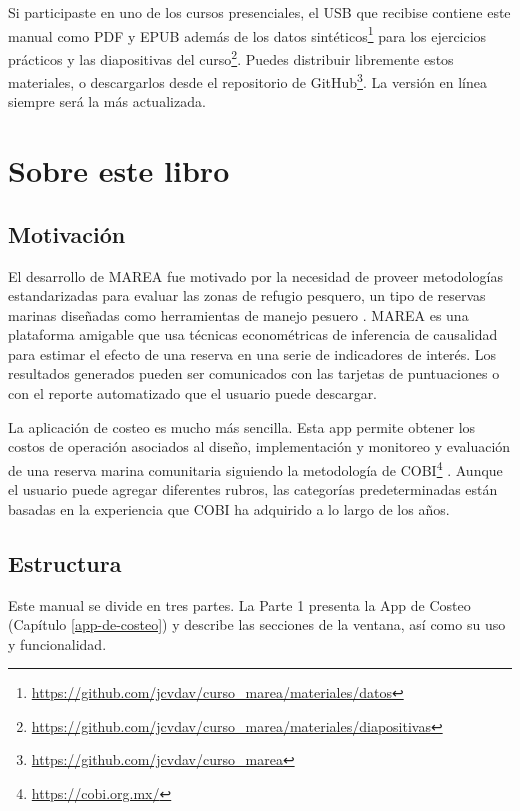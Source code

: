 \documentclass[]{krantz}
\renewcommand{\href}[2]{#2\footnote{\url{#1}}}
\begin{document}
Si participaste en uno de los cursos presenciales, el USB que recibise
contiene este manual como PDF y EPUB además de los
\href{https://github.com/jcvdav/curso_marea/materiales/datos}{datos
sintéticos} para los ejercicios prácticos y las
\href{https://github.com/jcvdav/curso_marea/materiales/diapositivas}{diapositivas
del curso}. Puedes distribuir libremente estos materiales, o
descargarlos desde el
\href{https://github.com/jcvdav/curso_marea}{repositorio de GitHub}. La
versión en línea siempre será la más actualizada.

\hypertarget{sobre-este-libro}{%
\section{Sobre este libro}\label{sobre-este-libro}}

\hypertarget{motivacion}{%
\subsection{Motivación}\label{motivacion}}

El desarrollo de MAREA fue motivado por la necesidad de proveer
metodologías estandarizadas para evaluar las zonas de refugio pesquero,
un tipo de reservas marinas diseñadas como herramientas de manejo
pesuero \citep{nom}. MAREA es una plataforma amigable que usa técnicas
econométricas de inferencia de causalidad para estimar el efecto de una
reserva en una serie de indicadores de interés. Los resultados generados
pueden ser comunicados con las tarjetas de puntuaciones o con el reporte
automatizado que el usuario puede descargar.

La aplicación de costeo es mucho más sencilla. Esta app permite obtener
los costos de operación asociados al diseño, implementación y monitoreo
y evaluación de una reserva marina comunitaria siguiendo la metodología
de \href{https://cobi.org.mx/}{COBI} \citep{uribe_2010}. Aunque el
usuario puede agregar diferentes rubros, las categorías predeterminadas
están basadas en la experiencia que COBI ha adquirido a lo largo de los
años.

\hypertarget{estructura}{%
\subsection{Estructura}\label{estructura}}

Este manual se divide en tres partes. La Parte 1 presenta la App de
Costeo (Capítulo \ref{app-de-costeo}) y describe las secciones de la
ventana, así como su uso y funcionalidad.
\end{document}
